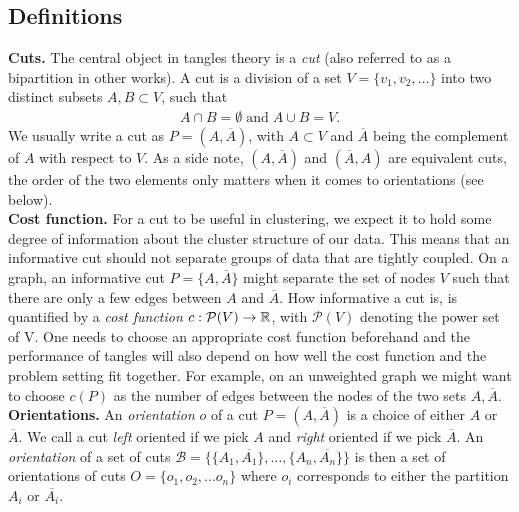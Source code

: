 \subsection{Definitions}
\textbf{Cuts.} The central object in tangles theory is a \textit{cut} (also referred to as a bipartition in other works). 
A cut is a division of a set $V =  \{ v_1, v_2, \ldots \}$ into two distinct subsets $A, B \subset V$, such that
\begin{align*}
A \cap B = \emptyset\;\text{and}\;A \cup B = V.
\end{align*}
We usually write a cut as $P = \left( A, \overline{A} \right)$, with $A \subset V$ and $\overline{A}$ being the
complement of $A$ with respect to $V$. As a side note, $\left( A, \overline{A} \right)$ and $\left( \overline{A}, A \right)$ are
equivalent cuts, the order of the two elements only matters when it comes to orientations (see below). \\

\noindent
\textbf{Cost function.} For a cut to be useful in clustering, we expect it to hold some degree of information about the cluster 
structure of our data. This means that an informative cut should not separate groups of data that are tightly coupled.
On a graph, an informative cut $P = \{A, \overline{A}\}$ might separate the set of nodes $V$ such that there 
are only a few edges between $A$ and $\overline{A}$. How informative a cut is, is quantified by a \textit{cost function} $c: \mathcal{P}(V) \to \mathbb{R}$, 
with $\mathcal{P}(V)$ denoting the power set of V. 
One needs to choose an appropriate cost function beforehand and the performance of tangles will also depend on how well the cost function and the problem setting fit together. 
For example, on an unweighted graph we might want to choose $c(P)$ as the number of edges
between the nodes of the two sets $A, \overline{A}$. \\

\noindent
\textbf{Orientations.}
An \textit{orientation} $o$ of a cut $P = \left(   A, \overline{A} \right) $ is a choice of either $A$ or $\overline{A}$. We call a cut \textit{left} oriented
if we pick $A$ and \textit{right} oriented if we pick $\overline{A}$.
An \textit{orientation} of a set of cuts 
$\mathcal{B} = \{\{A_1, \overline{A_1}\}, \ldots, \{A_n, \overline{A_n}\} \}$ is  
then a set of orientations of cuts $O = \{o_1, o_2, \ldots o_n\}$
where $o_i$ corresponds to either the partition $A_i$ or $\overline{A_i}$. \\

